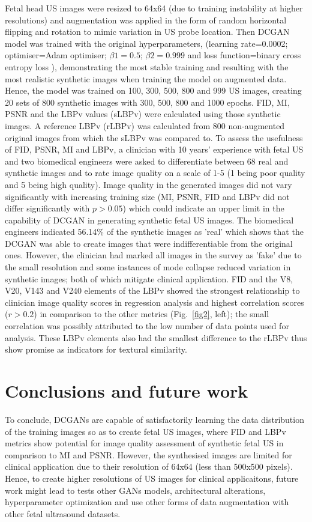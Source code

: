 \documentclass[runningheads]{llncs}
\begin{document}
Fetal head US images were resized to 64x64 (due to training instability at higher resolutions) and augmentation was applied in the form of random horizontal flipping and rotation to mimic variation in US probe location.
Then DCGAN model was trained with the original hyperparameters, (learning rate=0.0002; optimiser=Adam optimiser; $\beta1=0.5$; $\beta2= 0.999$ and loss function=binary cross entropy loss  \cite{radford2016unsupervised}), demonstrating the most stable training and resulting with the most realistic synthetic images when training the model on augmented data.
Hence, the model was trained on 100, 300, 500, 800 and 999 US images, creating 20 sets of 800 synthetic images with 300, 500, 800 and 1000 epochs.
FID, MI, PSNR and the LBPv values (sLBPv) were calculated using those synthetic images.
A reference LBPv (rLBPv) was calculated from 800 non-augmented original images from which the sLBPv was compared to.
To assess the usefulness of FID, PSNR, MI and LBPv, a clinician with 10 years' experience with fetal US and two biomedical engineers were asked to differentiate between 68 real and synthetic images and to rate image quality on a scale of 1-5 (1 being poor quality and 5 being high quality).
Image quality in the generated images did not vary significantly with increasing training size (MI, PSNR, FID and LBPv did not differ significantly with $p>0.05$) which could indicate an upper limit in the capability of DCGAN in generating synthetic fetal US images.
The biomedical engineers indicated 56.14\% of the synthetic images as 'real' which shows that the DCGAN was able to create images that were indifferentiable from the original ones.
However, the clinician had marked all images in the survey as 'fake' due to the small resolution and some instances of mode collapse reduced variation in synthetic images; both of which mitigate clinical application.
FID and the V8, V20, V143 and V240 elements of the LBPv showed the strongest relationship to clinician image quality scores in regression analysis and highest correlation scores ($r>0.2$) in comparison to the other metrics (Fig.~\ref{fig2}, left); the small correlation was possibly attributed to the low number of data points used for analysis. These LBPv elements also had the smallest difference to the rLBPv thus show promise as indicators for textural similarity.


\section{Conclusions and future work}
To conclude, DCGANs are capable of satisfactorily learning the data distribution of the training images so as to create fetal US images, where FID and LBPv metrics show potential for image quality assessment of synthetic fetal US in comparison to MI and PSNR.
However, the synthesised images are limited for clinical application due to their resolution of 64x64 (less than 500x500 pixels).
Hence, to create higher resolutions of US images for clinical applicaitons, future work might lead to tests other GANs models, architectural alterations, hyperparameter optimization and use other forms of data augmentation with other fetal ultrasound datasets.
\end{document}

